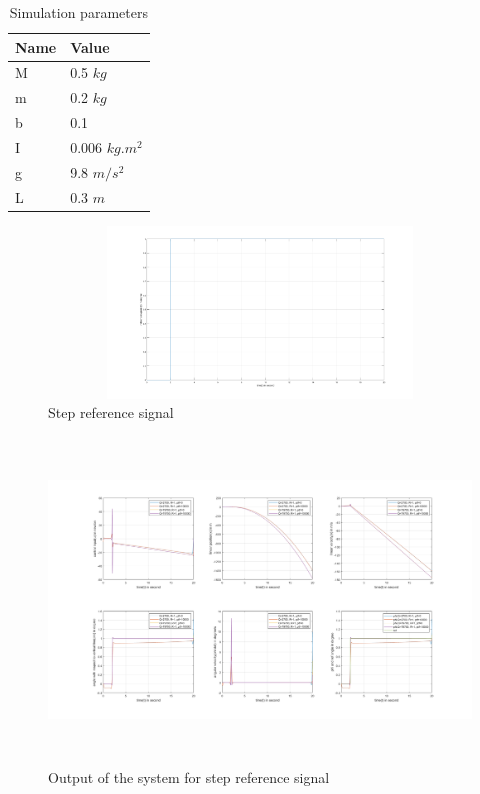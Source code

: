 \documentclass[12pt]{article}
\begin{document}
\begin{table}[h]
	\centering
	\caption{Simulation parameters}
	\label{table-para}
	\begin{tabular}{|l|l|}
		\hline
		Name & Value     \\ \hline
		M    & 0.5 $kg$     \\ \hline
		m    & 0.2 $kg$     \\ \hline
		b    & 0.1       \\ \hline
		I    & 0.006 $kg.m^2$ \\ \hline
		g    & 9.8 $m/s^2$   \\ \hline
		L    & 0.3 $m$      \\ \hline
	\end{tabular}
\end{table}
\newpage
\begin{figure}[h]
	\centering
	\includegraphics[height=1.8in,width=5.5in]{step_ref.png}
	\caption{Step reference signal}
	\label{fig:step-ref}
\end{figure}
\vspace{2cm}
\begin{figure}[h]
	\centering
	\includegraphics[height=3.4in,width=5.5in]{step_output.png}
	\caption{Output of the system for step reference signal}
	\label{fig:step_output}
\end{figure}
\end{document}
